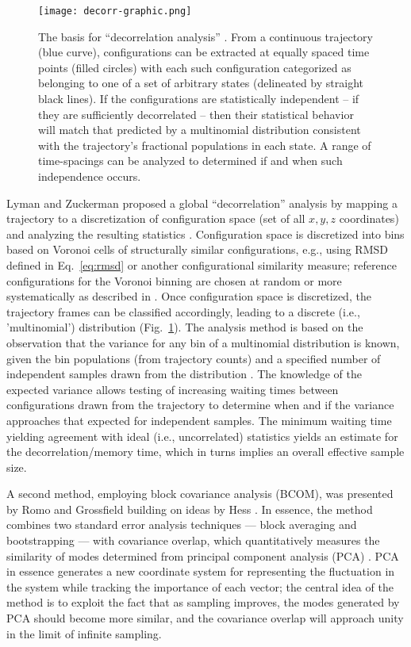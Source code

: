 \begin{figure}
  \centering
  \texttt{[image: decorr-graphic.png]}
  \caption{The basis for ``decorrelation analysis'' \cite{Lyman2007a}.
  From a continuous trajectory (blue curve), configurations can be extracted at equally spaced time points (filled circles) with each such configuration categorized as belonging to one of a set of arbitrary states (delineated by straight black lines).  
  If the configurations are statistically independent -- if they are sufficiently decorrelated -- then their statistical behavior will match that predicted by a multinomial distribution consistent with the trajectory's fractional populations in each state.
  A range of time-spacings can be analyzed to determined if and when such independence occurs.}
  \label{fig:decorr}
\end{figure}

Lyman and Zuckerman proposed a global ``decorrelation'' analysis by mapping a trajectory to a discretization of configuration space (set of all $x, y, z$ coordinates) and analyzing the resulting statistics \cite{Lyman2007a}.
Configuration space is discretized into bins based on Voronoi cells of structurally similar configurations,  e.g., using RMSD defined in Eq.\ \eqref{eq:rmsd} or another configurational similarity measure; reference configurations for the Voronoi binning are chosen at random or more systematically as described in \cite{Lyman2007a}.
Once configuration space is discretized, the trajectory frames can be classified accordingly, leading to a discrete (i.e., 'multinomial') distribution (Fig.\ \ref{fig:decorr}).
The analysis method is based on the observation that the variance for any bin of a multinomial distribution is known, given the bin populations (from trajectory counts) and a specified number of independent samples drawn from the distribution \cite{Lyman2007a}.
The knowledge of the expected variance allows testing of increasing waiting times between configurations drawn from the trajectory to determine when and if the variance approaches that expected for independent samples.
The minimum waiting time yielding agreement with ideal (i.e., uncorrelated) statistics yields an estimate for the decorrelation/memory time, which in turns implies an overall effective sample size. 



A second method, employing block covariance analysis (BCOM), was presented by Romo and Grossfield \cite{Romo2011} building on ideas by Hess \cite{Hess2002}.  In essence, the method combines two standard error analysis techniques --- block averaging \cite{Flyvbjerg-1989} and bootstrapping \cite{Tibshirani1998} --- with covariance overlap, which quantitatively measures the similarity of modes determined from principal component analysis (PCA) \cite{Hess2002}.  PCA in essence generates a new coordinate system for representing the fluctuation in the system while tracking the importance of each vector; the central idea of the method is to exploit the fact that as sampling improves, the modes generated by PCA should become more similar, and the covariance overlap will approach unity in the limit of infinite sampling.

